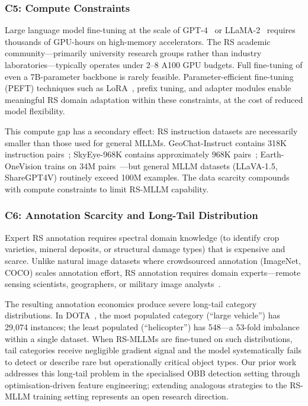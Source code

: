 \subsubsection{C5: Compute Constraints}\label{sec2:compute}

Large language model fine-tuning at the scale of GPT-4~\cite{openai2023gpt4}
or LLaMA-2~\cite{llama2023} requires thousands of GPU-hours on high-memory
accelerators. The RS academic community---primarily university research groups
rather than industry laboratories---typically operates under 2--8 A100 GPU
budgets. Full fine-tuning of even a 7B-parameter backbone is rarely feasible.
Parameter-efficient fine-tuning (PEFT) techniques such as
LoRA~\cite{hu2022lora}, prefix tuning, and adapter modules enable meaningful
RS domain adaptation within these constraints, at the cost of reduced model
flexibility.

This compute gap has a secondary effect: RS instruction datasets are
necessarily smaller than those used for general MLLMs. GeoChat-Instruct
contains 318K instruction pairs~\cite{geochat2024}; SkyEye-968K
contains approximately 968K pairs~\cite{skyeyegpt2025}; Earth-OneVision
trains on 34M pairs~\cite{earthonevision2026}---but general MLLM datasets
(LLaVA-1.5, ShareGPT4V) routinely exceed 100M examples. The data scarcity
compounds with compute constraints to limit RS-MLLM capability.

\subsubsection{C6: Annotation Scarcity and Long-Tail Distribution}\label{sec2:longtail}

Expert RS annotation requires spectral domain knowledge (to identify crop
varieties, mineral deposits, or structural damage types) that is expensive
and scarce. Unlike natural image datasets where crowdsourced annotation
(ImageNet, COCO) scales annotation effort, RS annotation requires
domain experts---remote sensing scientists, geographers, or military
image analysts~\cite{long2021creating}.

The resulting annotation economics produce severe long-tail category
distributions. In DOTA~\cite{xia2018dota}, the most populated category
(``large vehicle'') has 29,074 instances; the least populated (``helicopter'')
has 548---a 53-fold imbalance within a single dataset. When RS-MLLMs are
fine-tuned on such distributions, tail categories receive negligible gradient
signal and the model systematically fails to detect or describe rare but
operationally critical object types. Our prior work~\cite{odfe2025}
addresses this long-tail problem in the specialised OBB detection setting
through optimisation-driven feature engineering; extending analogous
strategies to the RS-MLLM training setting represents an open research
direction.

